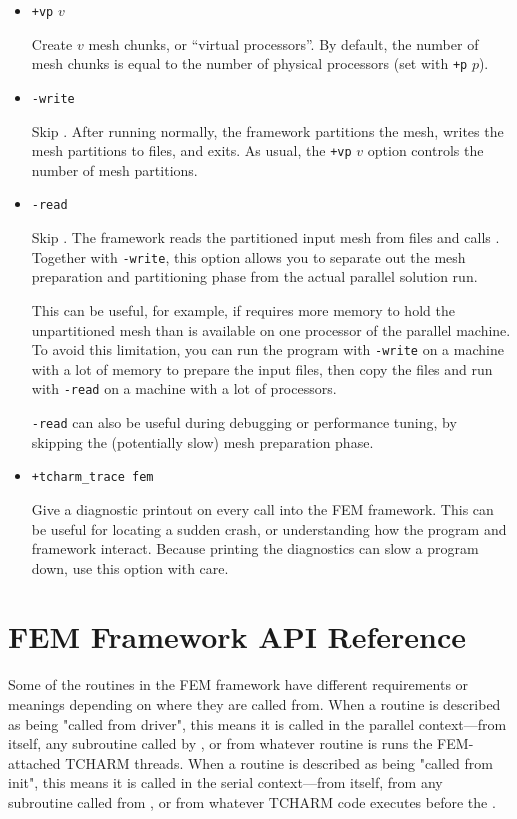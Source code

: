 \documentclass[10pt]{article}
\begin{document}
\begin{itemize}
\item {\tt +vp} $v$  

Create $v$ mesh chunks, or ``virtual processors''.
By default, the number of mesh chunks is equal to the number of 
physical processors (set with {\tt +p} $p$).


\item {\tt -write}

Skip .
After running  normally, the framework partitions the mesh, 
writes the mesh partitions to files, and exits.  As usual, the
{\tt +vp} $v$ option controls the number of mesh partitions.


\item {\tt -read}

Skip .
The framework reads the partitioned input mesh from files
and calls .  Together with {\tt -write}, this option
allows you to separate out the mesh preparation and partitioning 
phase from the actual parallel solution run.

This can be useful, for example, if  requires more memory 
to hold the unpartitioned mesh than is available on one processor of 
the parallel machine.  To avoid this limitation, you can run the program
with {\tt -write} on a machine with a lot of memory to prepare the input
files, then copy the files and run with {\tt -read} on a machine with 
a lot of processors.

{\tt -read} can also be useful during debugging or performance tuning, 
by skipping the (potentially slow) mesh preparation phase.


\item {\tt +tcharm\_trace fem}

Give a diagnostic printout on every call into the FEM framework.
This can be useful for locating a sudden crash, or understanding
how the program and framework interact.  Because printing the 
diagnostics can slow a program down, use this option with care.

\end{itemize}


\section{FEM Framework API Reference}

Some of the routines in the FEM framework have different requirements or meanings
depending on where they are called from.  When a routine is described
as being "called from driver", this means it is called in the parallel
context---from  itself, any subroutine called by ,
or from whatever routine is runs the FEM-attached TCHARM threads.
When a routine is described as being "called from init", this means it is 
called in the serial context---from  itself, from any subroutine
called from , or from whatever TCHARM code executes before the
.
\end{document}

